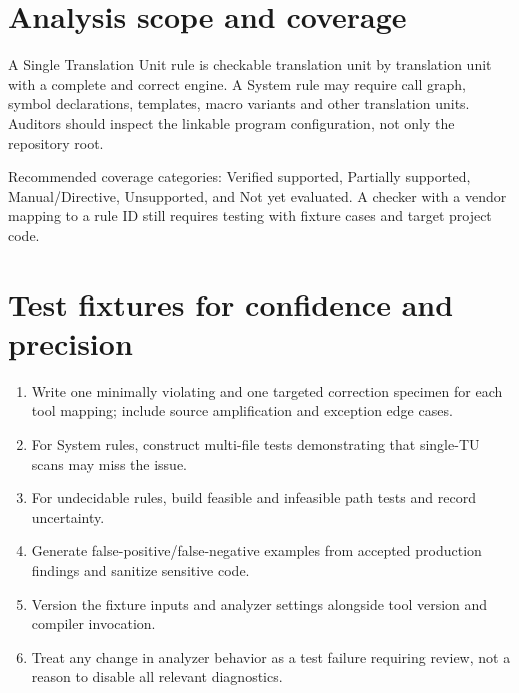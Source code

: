 \documentclass[10pt,letterpaper]{article}
\begin{document}
\section{Analysis scope and coverage}
A Single Translation Unit rule is checkable translation unit by translation unit with a complete and correct engine. A System rule may require call graph, symbol declarations, templates, macro variants and other translation units. Auditors should inspect the linkable program configuration, not only the repository root.

Recommended coverage categories: Verified supported, Partially supported, Manual/Directive, Unsupported, and Not yet evaluated. A checker with a vendor mapping to a rule ID still requires testing with fixture cases and target project code.


\section{Test fixtures for confidence and precision}
\begin{enumerate}
\item Write one minimally violating and one targeted correction specimen for each tool mapping; include source amplification and exception edge cases.
\item For System rules, construct multi-file tests demonstrating that single-TU scans may miss the issue.
\item For undecidable rules, build feasible and infeasible path tests and record uncertainty.
\item Generate false-positive/false-negative examples from accepted production findings and sanitize sensitive code.
\item Version the fixture inputs and analyzer settings alongside tool version and compiler invocation.
\item Treat any change in analyzer behavior as a test failure requiring review, not a reason to disable all relevant diagnostics.
\end{enumerate}
\end{document}
